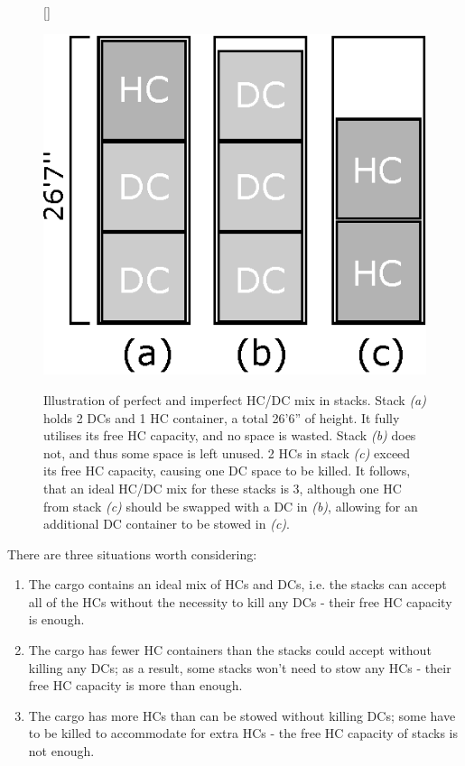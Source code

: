 \documentclass[preprint,12pt,3p]{elsarticle}
\begin{document}
\begin{figure}[ht]
[\FBwidth]
{\caption[Illustration of perfect and imperfect HC/DC mix in stacks.]{Illustration of perfect and imperfect HC/DC mix in stacks. Stack \textit{(a)} holds 2 DCs and 1 HC container, a total 26'6'' of height. It fully utilises its free HC capacity, and no space is wasted. Stack \textit{(b)} does not, and thus some space is left unused. 2 HCs in stack \textit{(c)} exceed its free HC capacity, causing one DC space to be killed. It follows, that an ideal HC/DC mix for these stacks is 3, although one HC from stack \textit{(c)} should be swapped with a DC in \textit{(b)}, allowing for an additional DC container to be stowed in \textit{(c)}.}\label{fig:hcdc}}
{\includegraphics[width=0.8\linewidth]{Figures/hcdc_stacks.eps}}
\end{figure}

There are three situations worth considering:
\begin{enumerate}[noitemsep]
    \item The cargo contains an ideal mix of HCs and DCs, i.e. the stacks can accept all of the HCs without the necessity to kill any DCs - their free HC capacity is enough.
    \item The cargo has fewer HC containers than the stacks could accept without killing any DCs; as a result, some stacks won't need to stow any HCs - their free HC capacity is more than enough.
    \item The cargo has more HCs than can be stowed without killing DCs; some have to be killed to accommodate for extra HCs - the free HC capacity of stacks is not enough.
\end{enumerate}
\end{document}
